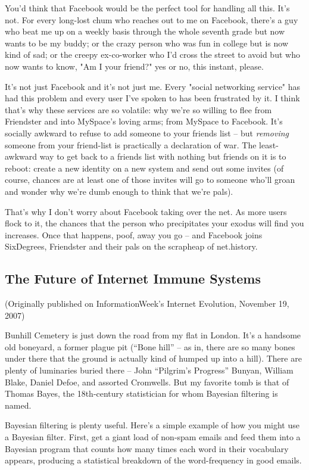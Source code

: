 You'd think that Facebook would be the perfect tool for handling
all this. It's not. For every long-lost chum who reaches out to me
on Facebook, there's a guy who beat me up on a weekly basis through
the whole seventh grade but now wants to be my buddy; or the crazy
person who was fun in college but is now kind of sad; or the creepy
ex-co-worker who I'd cross the street to avoid but who now wants to
know, "Am I your friend?" yes or no, this instant, please.

It's not just Facebook and it's not just me. Every "social
networking service" has had this problem and every user I've spoken
to has been frustrated by it. I think that's why these services are
so volatile: why we're so willing to flee from Friendster and into
MySpace's loving arms; from MySpace to Facebook. It's socially
awkward to refuse to add someone to your friends list -- but
\emph{removing} someone from your friend-list is practically a
declaration of war. The least-awkward way to get back to a friends
list with nothing but friends on it is to reboot: create a new
identity on a new system and send out some invites (of course,
chances are at least one of those invites will go to someone who'll
groan and wonder why we're dumb enough to think that we're pals).

That's why I don't worry about Facebook taking over the net. As
more users flock to it, the chances that the person who
precipitates your exodus will find you increases. Once that
happens, poof, away you go -- and Facebook joins SixDegrees,
Friendster and their pals on the scrapheap of net.history.

\subsection{The Future of Internet Immune Systems}

(Originally published on InformationWeek's Internet Evolution,
November 19, 2007)

Bunhill Cemetery is just down the road from my flat in London. It’s
a handsome old boneyard, a former plague pit (“Bone hill” -- as in,
there are so many bones under there that the ground is actually
kind of humped up into a hill). There are plenty of luminaries
buried there -- John “Pilgrim’s Progress” Bunyan, William Blake,
Daniel Defoe, and assorted Cromwells. But my favorite tomb is that
of Thomas Bayes, the 18th-century statistician for whom Bayesian
filtering is named.

Bayesian filtering is plenty useful. Here’s a simple example of how
you might use a Bayesian filter. First, get a giant load of
non-spam emails and feed them into a Bayesian program that counts
how many times each word in their vocabulary appears, producing a
statistical breakdown of the word-frequency in good emails.

